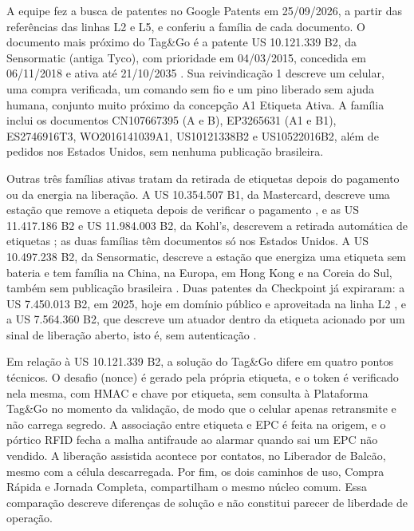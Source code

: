 A equipe fez a busca de patentes no Google Patents em 25/09/2026, a partir das referências das linhas L2 e L5, e conferiu a família de cada documento. O documento mais próximo do Tag\&Go é a patente US 10.121.339 B2, da Sensormatic (antiga Tyco), com prioridade em 04/03/2015, concedida em 06/11/2018 e ativa até 21/10/2035 \cite{googlepatents2018us10121339}. Sua reivindicação 1 descreve um celular, uma compra verificada, um comando sem fio e um pino liberado sem ajuda humana, conjunto muito próximo da concepção A1 Etiqueta Ativa. A família inclui os documentos CN107667395 (A e B), EP3265631 (A1 e B1), ES2746916T3, WO2016141039A1, US10121338B2 e US10522016B2, além de pedidos nos Estados Unidos, sem nenhuma publicação brasileira.

Outras três famílias ativas tratam da retirada de etiquetas depois do pagamento ou da energia na liberação. A US 10.354.507 B1, da Mastercard, descreve uma estação que remove a etiqueta depois de verificar o pagamento \cite{googlepatents2019us10354507}, e as US 11.417.186 B2 e US 11.984.003 B2, da Kohl's, descrevem a retirada automática de etiquetas \cite{googlepatents2022us11417186}; as duas famílias têm documentos só nos Estados Unidos. A US 10.497.238 B2, da Sensormatic, descreve a estação que energiza uma etiqueta sem bateria e tem família na China, na Europa, em Hong Kong e na Coreia do Sul, também sem publicação brasileira \cite{googlepatents2019us10497238}. Duas patentes da Checkpoint já expiraram: a US 7.450.013 B2, em 2025, hoje em domínio público e aproveitada na linha L2 \cite{googlepatents2008us7450013}, e a US 7.564.360 B2, que descreve um atuador dentro da etiqueta acionado por um sinal de liberação aberto, isto é, sem autenticação \cite{googlepatents2009us7564360}.

Em relação à US 10.121.339 B2, a solução do Tag\&Go difere em quatro pontos técnicos. O desafio (nonce) é gerado pela própria etiqueta, e o token é verificado nela mesma, com HMAC e chave por etiqueta, sem consulta à Plataforma Tag\&Go no momento da validação, de modo que o celular apenas retransmite e não carrega segredo. A associação entre etiqueta e EPC é feita na origem, e o pórtico RFID fecha a malha antifraude ao alarmar quando sai um EPC não vendido. A liberação assistida acontece por contatos, no Liberador de Balcão, mesmo com a célula descarregada. Por fim, os dois caminhos de uso, Compra Rápida e Jornada Completa, compartilham o mesmo núcleo comum. Essa comparação descreve diferenças de solução e não constitui parecer de liberdade de operação.

